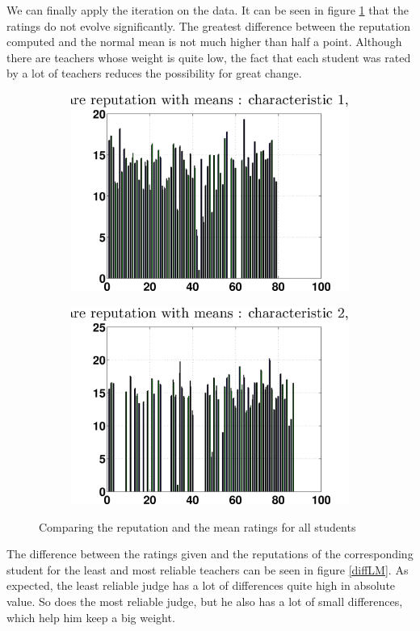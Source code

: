 \documentclass[12pt,a4paper]{article}
\begin{document}
We can finally apply the iteration on the data. It can be seen in figure \ref{compRM} that the ratings do not evolve significantly. The greatest difference between the reputation computed and the normal mean is not much higher than half a point.
Although there are teachers whose weight is quite low, the fact that each student was rated by a lot of teachers reduces the possibility for great change.
\begin{figure}[!h]
\centering
\begin{subfigure}[b]{\textwidth}
\includegraphics[width = 12cm]{preprocessSelect/ppscompareRepc1K6000.eps}
\end{subfigure}
\begin{subfigure}[b]{\textwidth}
\includegraphics[width = 12cm]{preprocessSelect/ppscompareRepc2K6000.eps}
\end{subfigure}
\caption{\label{compRM}Comparing the reputation and the mean ratings for all students}
\end{figure}
The difference between the ratings given and the reputations of the corresponding student for the least and most reliable teachers can be seen in figure \ref{diffLM}. As expected, the least reliable judge has a lot of differences quite high in absolute value. So does the most reliable judge, but he also has a lot of small differences, which help him keep a big weight.
\end{document}
